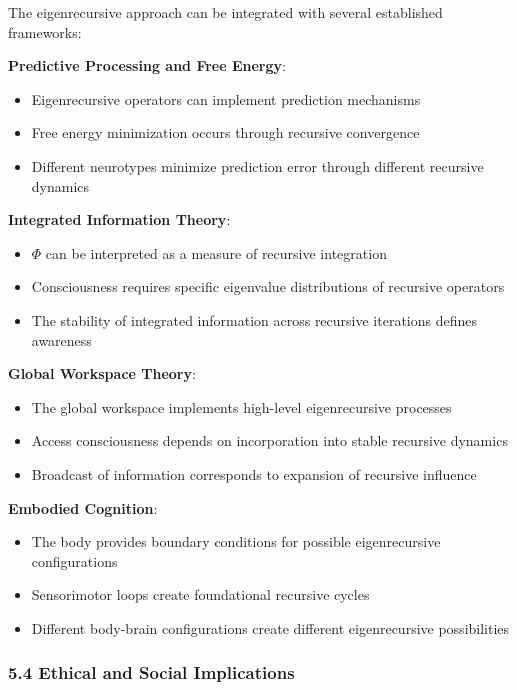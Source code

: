 \documentclass[
]{article}
\providecommand{\tightlist}{%
  \setlength{\itemsep}{0pt}\setlength{\parskip}{0pt}}
\begin{document}
The eigenrecursive approach can be integrated with several established
frameworks:

\textbf{Predictive Processing and Free Energy}:

\begin{itemize}
\tightlist
\item
  Eigenrecursive operators can implement prediction mechanisms
\item
  Free energy minimization occurs through recursive convergence
\item
  Different neurotypes minimize prediction error through different
  recursive dynamics
\end{itemize}

\textbf{Integrated Information Theory}:

\begin{itemize}
\tightlist
\item
  \(\Phi\) can be interpreted as a measure of recursive integration
\item
  Consciousness requires specific eigenvalue distributions of recursive
  operators
\item
  The stability of integrated information across recursive iterations
  defines awareness
\end{itemize}

\textbf{Global Workspace Theory}:

\begin{itemize}
\tightlist
\item
  The global workspace implements high-level eigenrecursive processes
\item
  Access consciousness depends on incorporation into stable recursive
  dynamics
\item
  Broadcast of information corresponds to expansion of recursive
  influence
\end{itemize}

\textbf{Embodied Cognition}:

\begin{itemize}
\tightlist
\item
  The body provides boundary conditions for possible eigenrecursive
  configurations
\item
  Sensorimotor loops create foundational recursive cycles
\item
  Different body-brain configurations create different eigenrecursive
  possibilities
\end{itemize}

\subsubsection{5.4 Ethical and Social
Implications}\label{ethical-and-social-implications}
\end{document}
